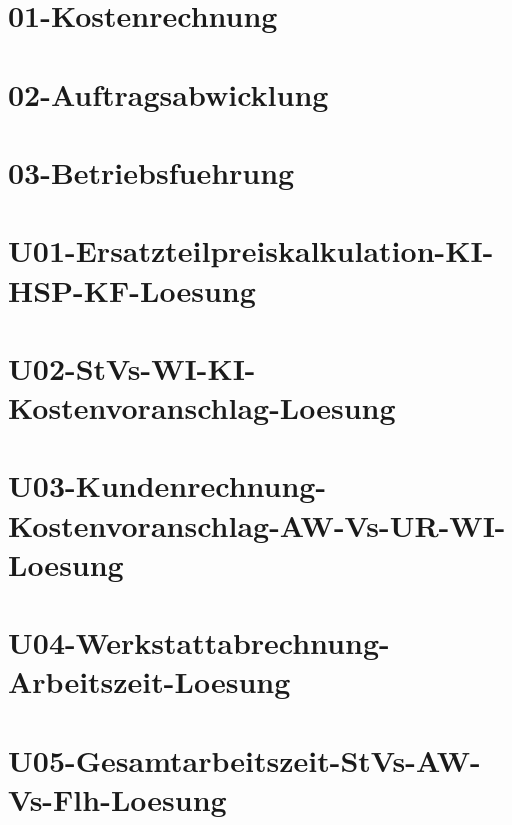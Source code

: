 



\chapter{01-Kostenrechnung}
%
\chapter{02-Auftragsabwicklung}
%
\chapter{03-Betriebsfuehrung}
%
\chapter{U01-Ersatzteilpreiskalkulation-KI-HSP-KF-Loesung}
%
\chapter{U02-StVs-WI-KI-Kostenvoranschlag-Loesung}
%
\chapter{U03-Kundenrechnung-Kostenvoranschlag-AW-Vs-UR-WI-Loesung}
%
\chapter{U04-Werkstattabrechnung-Arbeitszeit-Loesung}
%
\chapter{U05-Gesamtarbeitszeit-StVs-AW-Vs-Flh-Loesung}
%
